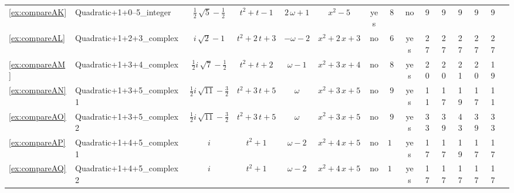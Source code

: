 \begin{tabular}{ll|c c c c|ccc|c c  c  c  c  c  }
\ref{ex:compareAK} & Quadratic+1+0--5\_integer & $ \frac{1}{2} \, \sqrt{5} - \frac{1}{2} $ & $ t^{2} + t - 1 $ & $ 2 \, \omega + 1 $ & $ x^{2} - 5 $ & yes & $ 8 $ & no & 9 & 9 & 9 & 9 & 9 \\
\ref{ex:compareAL} & Quadratic+1+2+3\_complex & $ i \, \sqrt{2} - 1 $ & $ t^{2} + 2 \, t + 3 $ & $ -\omega - 2 $ & $ x^{2} + 2 \, x + 3 $ & no & $ 6 $ & yes & 27 & 27 & 27 & 27 & 27 \\
\ref{ex:compareAM} & Quadratic+1+3+4\_complex & $ \frac{1}{2} i \, \sqrt{7} - \frac{1}{2} $ & $ t^{2} + t + 2 $ & $ \omega - 1 $ & $ x^{2} + 3 \, x + 4 $ & no & $ 8 $ & yes & 20 & 20 & 21 & 20 & 19 \\
\ref{ex:compareAN} & Quadratic+1+3+5\_complex1 & $ \frac{1}{2} i \, \sqrt{11} - \frac{3}{2} $ & $ t^{2} + 3 \, t + 5 $ & $ \omega $ & $ x^{2} + 3 \, x + 5 $ & no & $ 9 $ & yes & 11 & 17 & 19 & 17 & 11 \\
\ref{ex:compareAO} & Quadratic+1+3+5\_complex2  & $ \frac{1}{2} i \, \sqrt{11} - \frac{3}{2} $ & $ t^{2} + 3 \, t + 5 $ & $ \omega $ & $ x^{2} + 3 \, x + 5 $ & no & $ 9 $ & yes & 33 & 39 & 43 & 39 & 33 \\
\ref{ex:compareAP} & Quadratic+1+4+5\_complex1 & $ i $ & $ t^{2} + 1 $ & $ \omega - 2 $ & $ x^{2} + 4 \, x + 5 $ & no & $ 10 $ & yes & 17 & 17 & 19 & 17 & 17 \\
\ref{ex:compareAQ} & Quadratic+1+4+5\_complex2 & $ i $ & $ t^{2} + 1 $ & $ \omega - 2 $ & $ x^{2} + 4 \, x + 5 $ & no & $ 10 $ & yes & 17 & 17 & 17 & 17 & 17 \\
\end{tabular}
